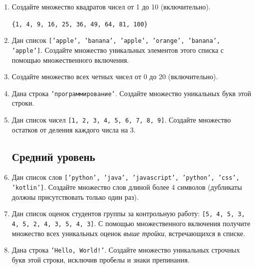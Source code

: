 \documentclass[a4,12pt]{article}
\theoremstyle{remark}
\begin{document}
\begin{enumerate}

    \subsection*{Начальный уровень}

    \item Создайте множество квадратов чисел от 1 до 10 (включительно).

    \begin{exerciseexample}
        \texttt{\{1, 4, 9, 16, 25, 36, 49, 64, 81, 100\}}
    \end{exerciseexample}

    \item Дан список \texttt{['apple', 'banana', 'apple', 'orange', 'banana', 'apple']}.
    Создайте множество уникальных элементов этого списка с помощью
    множественного включения.

    \item Создайте множество всех четных чисел от 0 до 20 (включительно).

    \item Дана строка \texttt{'программирование'}.
    Создайте множество уникальных букв этой строки.

    \item Дан список чисел \texttt{[1, 2, 3, 4, 5, 6, 7, 8, 9]}.
    Создайте множество остатков от деления каждого числа на 3.

    \subsection*{Средний уровень}

    \item Дан список слов \texttt{['python', 'java', 'javascript', 'python', 'css', 'kotlin']}.
    Создайте множество слов длиной более 4 символов
    (дубликаты должны присутствовать только один раз).

    \item Дан список оценок студентов группы за контрольную работу:
    \texttt{[5, 4, 5, 3, 4, 5, 2, 4, 3, 5, 4, 3]}.
    С помощью множественного включения получите множество всех уникальных
    оценок \emph{выше тройки}, встречающихся в списке.

    \item Дана строка \texttt{'Hello, World!'}.
    Создайте множество уникальных строчных букв этой строки,
    исключив пробелы и знаки препинания.


\end{enumerate}
\end{document}
